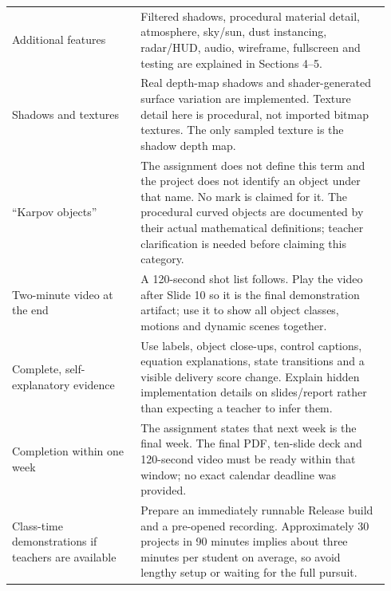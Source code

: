 \begin{longtable}{L{0.32\linewidth}L{0.62\linewidth}}
Additional features & Filtered shadows, procedural material detail, atmosphere, sky/sun, dust instancing, radar/HUD, audio, wireframe, fullscreen and testing are explained in Sections 4--5.\\
Shadows and textures & Real depth-map shadows and shader-generated surface variation are implemented. Texture detail here is procedural, not imported bitmap textures. The only sampled texture is the shadow depth map.\\
``Karpov objects'' & The assignment does not define this term and the project does not identify an object under that name. No mark is claimed for it. The procedural curved objects are documented by their actual mathematical definitions; teacher clarification is needed before claiming this category.\\
Two-minute video at the end & A 120-second shot list follows. Play the video after Slide 10 so it is the final demonstration artifact; use it to show all object classes, motions and dynamic scenes together.\\
Complete, self-explanatory evidence & Use labels, object close-ups, control captions, equation explanations, state transitions and a visible delivery score change. Explain hidden implementation details on slides/report rather than expecting a teacher to infer them.\\
Completion within one week & The assignment states that next week is the final week. The final PDF, ten-slide deck and 120-second video must be ready within that window; no exact calendar deadline was provided.\\
Class-time demonstrations if teachers are available & Prepare an immediately runnable Release build and a pre-opened recording. Approximately 30 projects in 90 minutes implies about three minutes per student on average, so avoid lengthy setup or waiting for the full pursuit.\\
\bottomrule
\end{longtable}


